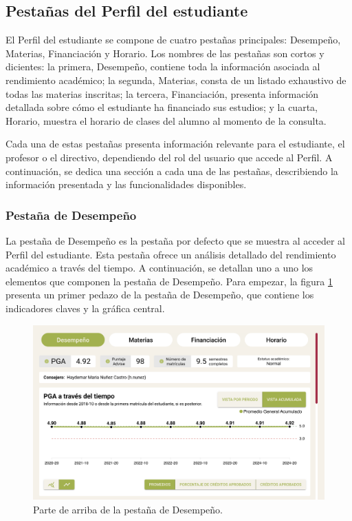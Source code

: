 \subsection{Pestañas del Perfil del estudiante}

El Perfil del estudiante se compone de cuatro pestañas principales: Desempeño, Materias, Financiación y Horario. Los nombres de las pestañas son cortos y dicientes: la primera, Desempeño, contiene toda la información asociada al rendimiento académico; la segunda, Materias, consta de un listado exhaustivo de todas las materias inscritas; la tercera, Financiación, presenta información detallada sobre cómo el estudiante ha financiado sus estudios; y la cuarta, Horario, muestra el horario de clases del alumno al momento de la consulta.

Cada una de estas pestañas presenta información relevante para el estudiante, el profesor o el directivo, dependiendo del rol del usuario que accede al Perfil. A continuación, se dedica una sección a cada una de las pestañas, describiendo la información presentada y las funcionalidades disponibles.

\subsubsection{Pestaña de Desempeño}

La pestaña de Desempeño es la pestaña por defecto que se muestra al acceder al Perfil del estudiante. Esta pestaña ofrece un análisis detallado del rendimiento académico a través del tiempo. A continuación, se detallan uno a uno los elementos que componen la pestaña de Desempeño. Para empezar, la figura \ref{fig:desempeno} presenta un primer pedazo de la pestaña de Desempeño, que contiene los indicadores claves y la gráfica central.

\begin{figure}[H]
	\centering
	\includegraphics[width=\textwidth]{assets/nes/desempeno_1.png}
	\caption{Parte de arriba de la pestaña de Desempeño.}
	\label{fig:desempeno}
\end{figure}

